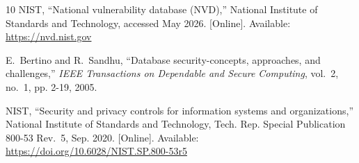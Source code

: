 \documentclass[journal]{IEEEtran}
\begin{document}
\begin{thebibliography}{10}
\BIBentryALTinterwordspacing
{NIST}, ``National vulnerability database ({NVD}),'' National Institute of
  Standards and Technology, accessed May 2026. [Online]. Available:
  \url{https://nvd.nist.gov}
\BIBentrySTDinterwordspacing

E.~Bertino and R.~Sandhu, ``Database security-concepts, approaches, and
  challenges,'' \emph{{IEEE} Transactions on Dependable and Secure Computing},
  vol.~2, no.~1, pp. 2-19, 2005.

\BIBentryALTinterwordspacing
{NIST}, ``Security and privacy controls for information systems and
  organizations,'' National Institute of Standards and Technology, Tech. Rep.
  Special Publication 800-53 Rev.~5, Sep. 2020. [Online]. Available:
  \url{https://doi.org/10.6028/NIST.SP.800-53r5}
\BIBentrySTDinterwordspacing

\end{thebibliography}
\end{document}
